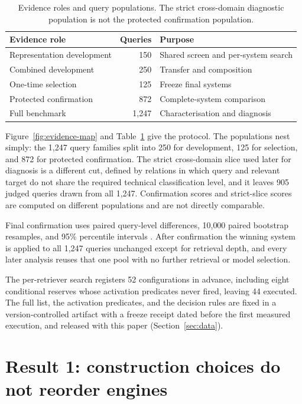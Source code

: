 \documentclass[preprint,11pt,authoryear]{elsarticle}
\begin{document}
\begin{table}[!t]
\caption{Evidence roles and query populations. The strict cross-domain diagnostic population is not the protected confirmation population.}
\label{tab:protocol}
\centering
\small
\begin{tabular}{@{}lrl@{}}
\toprule
Evidence role & Queries & Purpose \\
\midrule
Representation development & 150 & Shared screen and per-system search \\
Combined development & 250 & Transfer and composition \\
One-time selection & 125 & Freeze final systems \\
Protected confirmation & 872 & Complete-system comparison \\
Full benchmark & 1{,}247 & Characterisation and diagnosis \\
\bottomrule
\end{tabular}
\end{table}

Figure~\ref{fig:evidence-map} and Table~\ref{tab:protocol} give the protocol. The populations nest simply: the 1{,}247 query families split into 250 for development, 125 for selection, and 872 for protected confirmation. The strict cross-domain slice used later for diagnosis is a different cut, defined by relations in which query and relevant target do not share the required technical classification level, and it leaves 905 judged queries drawn from all 1{,}247. Confirmation scores and strict-slice scores are computed on different populations and are not directly comparable.

Final confirmation uses paired query-level differences, 10{,}000 paired bootstrap resamples, and 95\% percentile intervals \citep{davison1997bootstrap}. After confirmation the winning system is applied to all 1{,}247 queries unchanged except for retrieval depth, and every later analysis reuses that one pool with no further retrieval or model selection.

The per-retriever search registers 52 configurations in advance, including eight conditional reserves whose activation predicates never fired, leaving 44 executed. The full list, the activation predicates, and the decision rules are fixed in a version-controlled artifact with a freeze receipt dated before the first measured execution, and released with this paper (Section~\ref{sec:data}).

\section{Result 1: construction choices do not reorder engines}
\label{sec:transfer}
\end{document}
